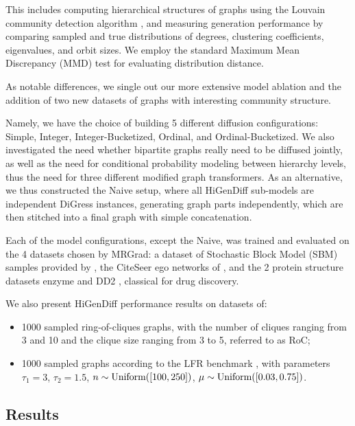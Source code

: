 This includes computing hierarchical structures of graphs using the Louvain community detection algorithm \cite{blondel_fast_2008}, and measuring generation performance by comparing sampled and true distributions of degrees, clustering coefficients, eigenvalues, and orbit sizes. We employ the standard Maximum Mean Discrepancy (MMD) test \cite{gretton_kernel_2012} for evaluating distribution distance. 

As notable differences, we single out our more extensive model ablation and the addition of two new datasets of graphs with interesting community structure.

Namely, we have the choice of building 5 different diffusion configurations: Simple, Integer, Integer-Bucketized, Ordinal, and Ordinal-Bucketized. We also investigated the need whether bipartite graphs really need to be diffused jointly, as well as the need for conditional probability modeling between hierarchy levels, thus the need for three different modified graph transformers. As an alternative, we thus constructed the Naive setup, where all HiGenDiff sub-models are independent DiGress instances, generating graph parts independently, which are then stitched into a final graph with simple concatenation.

Each of the model configurations, except the Naive, was trained and evaluated on the 4 datasets chosen by MRGrad: a dataset of Stochastic Block Model (SBM) samples provided by \cite{martinkus_spectre_2022}, the CiteSeer ego networks of \cite{sen_collective_2008}, and the 2 protein structure datasets enzyme \cite{schomburg_brenda_2004} and DD2 \cite{dobson_distinguishing_2003}, classical for drug discovery. 

We also present HiGenDiff performance results on datasets of:
\begin{itemize}
    \item 1000 sampled ring-of-cliques graphs, with the number of cliques ranging from 3 and 10 and the clique size ranging from 3 to 5, referred to as RoC;
    \item 1000 sampled graphs according to the LFR benchmark \cite{lancichinetti_finding_2011}, with parameters $\tau_1=3$, $\tau_2=1.5$, $n \sim \text{Uniform}\mathopen{}\left(\mathopen{}\left[100, 250\right]\right)$, $\mu \sim \text{Uniform}\mathopen{}\left(\mathopen{}\left[0.03, 0.75\right]\right)$.
\end{itemize}

\subsection{Results}

